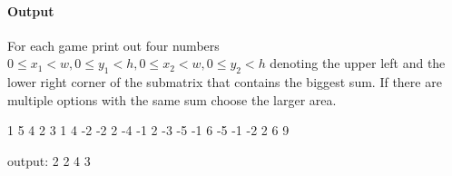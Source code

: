 \paragraph*{Output}

For each game print out four numbers $0\leq x_1 < w, 0\leq y_1 < h, 0\leq x_2 < w, 0 \leq y_2 < h$ denoting the upper left and the lower right corner of the submatrix that contains the biggest sum.
If there are multiple options with the same sum choose the larger area.


\begin{samples}
  1
  5 4
   2  3  1  4 -2
  -2  2 -4 -1  2
  -3 -5 -1  6 -5
  -1 -2  2  6  9
  
  output: 2 2 4 3 
  
\end{samples}


